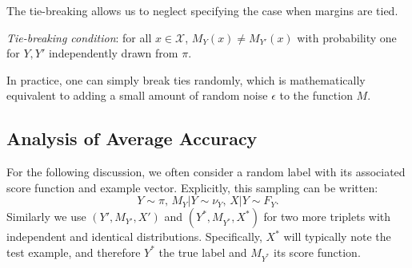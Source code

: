 \documentclass[twoside,11pt]{article}
\begin{document}
The tie-breaking allows us
to neglect specifying the case when
margins are tied.
\begin{definition}
\emph{Tie-breaking condition}: for all $x \in \mathcal{X}$,
$M_Y(x) \neq M_{Y'}(x)$
with probability one for $Y, Y'$ independently drawn from $\pi$.
\end{definition}
In practice, one can simply break ties randomly,
which is mathematically equivalent to adding a small amount of random
noise $\epsilon$ to the function $M$.

\subsection{Analysis of Average Accuracy}

For the following discussion, we often consider a random label with
its associated score function and example vector. Explicitly, this
sampling can be written:
\[Y \sim \pi,\, M_{Y}|Y \sim \nu_{Y},\, X|Y \sim F_{Y}. \]
Similarly we use $(Y',M_{Y'},X')$ and $(Y^*,M_{Y^*},X^*)$ for two more
triplets with independent and identical distributions. Specifically,
$X^*$ will typically note the test example, and therefore $Y^*$ the
true label and $M_{Y^*}$ its score function.
\end{document}
